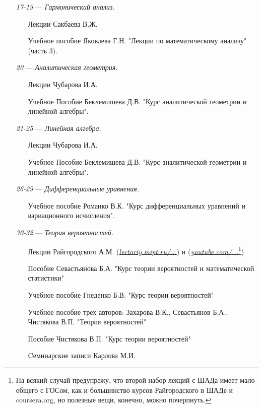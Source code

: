 \begin{itemize}
\item[\textit{17-19}] 
\; --- \: \textit{Гармонический анализ.}
\begin{itemize}
\item[\textbullet]
Лекции Сакбаева В.Ж.
\item[\textbullet]
Учебное пособие Яковлева Г.Н. "Лекции по математическому анализу"  (часть 3).
\end{itemize}

\item[\textit{20}] 
\; --- \: \textit{Аналитическая геометрия.}
\begin{itemize}
\item[\textbullet]
Лекции Чубарова И.А. 
\item[\textbullet]
Учебное Пособие Беклемишева Д.В. "Курс аналитической геометрии и линейной алгебры".
\end{itemize}

\item[\textit{21-25}] 
\; --- \: \textit{Линейная алгебра.}
\begin{itemize}
\item[\textbullet]
Лекции Чубарова И.А. 
\item[\textbullet]
Учебное Пособие Беклемишева Д.В. "Курс аналитической геометрии и линейной алгебры".
\end{itemize}

\item[\textit{26-29}] 
\; --- \: \textit{Дифференциальные уравнения.}
\begin{itemize}
\item[\textbullet] 
Учебное пособие Романко В.К. "Курс дифференциальных уравнений и вариационного исчисления".
\end{itemize}

\item[\textit{30-32}]
\; --- \: \textit{Теория вероятностей.}
\begin{itemize}
\item[\textbullet]
Лекции Райгородского А.М. (\href{http://lectoriy.mipt.ru/course/Maths-ProbabilityTheoryBasics-L15}{\textit{lectoriy.mipt.ru/...}}) и (\href{https://www.youtube.com/playlist?list=PLJOzdkh8T5kouOIbZDCqzB72hBn9T7gsJ}{\textit{youtube.com/...}\footnote{На всякий случай предупрежу, что второй набор лекций с ШАДа имеет мало общего с ГОСом, как и большинство курсов Райгородского в ШАДе и coursera.org, но полезные вещи, конечно, можно почерпнуть.}})
\item[\textbullet]
Пособие Севастьянова Б.А. "Курс теории вероятностей и математической статистики"
\item[\textbullet]
Учебное пособие Гнеденко Б.В. "Курс теории вероятностей"
\item [\textbullet]
Учебное пособие трех авторов: Захарова В.К., Севастьянов Б.А., Чистякова В.П. "Теория вероятностей"
\item[\textbullet]
Пособие Чистякова В.П. "Курс теории вероятностей"
\item[\textbullet]
Cеминарские записи Карлова М.И.
\end{itemize}


\end{itemize}
